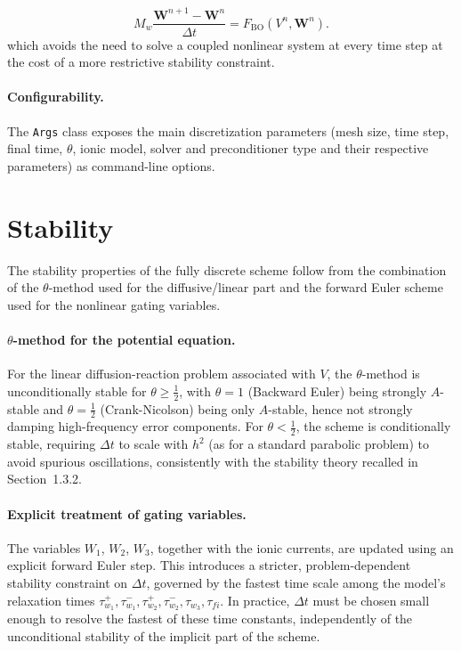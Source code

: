 \documentclass{Configuration_Files/PoliMi3i_thesis}
\begin{document}
\[
M_w\frac{\mathbf W^{n+1}-\mathbf W^n}{\Delta t}
=
F_{\mathrm{BO}}(V^n,\mathbf W^n).
\]
which
avoids the need to solve a coupled nonlinear system at every time step at the cost of a
more restrictive stability constraint.

\paragraph{Configurability.}
The \texttt{Args} class exposes the main discretization parameters (mesh size, time step,
final time, $\theta$, ionic model, solver and preconditioner type and their respective
parameters) as command-line options.


\section{Stability}

The stability properties of the fully discrete scheme follow from the combination of the
$\theta$-method used for the diffusive/linear part and the forward Euler scheme used for
the nonlinear gating variables.

\paragraph{$\theta$-method for the potential equation.}
For the linear diffusion-reaction problem associated with $V$, the $\theta$-method is
unconditionally stable for $\theta \geq \tfrac{1}{2}$, with $\theta = 1$ (Backward Euler)
being strongly $A$-stable and $\theta = \tfrac{1}{2}$ (Crank-Nicolson) being only
$A$-stable, hence not strongly damping high-frequency error components. For
$\theta < \tfrac{1}{2}$, the scheme is conditionally stable, requiring $\Delta t$ to scale
with $h^2$ (as for a standard parabolic problem) to avoid spurious oscillations,
consistently with the stability theory recalled in Section~1.3.2.

\paragraph{Explicit treatment of gating variables.}
The variables $W_1$, $W_2$, $W_3$, together with the ionic currents, are updated using an explicit
forward Euler step. This introduces a stricter, problem-dependent stability constraint on
$\Delta t$, governed by the fastest time scale among the model's relaxation times
$\tau_{w_1}^{+}, \tau_{w_1}^{-}, \tau_{w_2}^{+}, \tau_{w_2}^{-}, \tau_{w_3}, \tau_{fi}$. In practice, $\Delta t$
must be chosen small enough to resolve the fastest of these time constants, independently of
the unconditional stability of the implicit part of the scheme.
\end{document}
